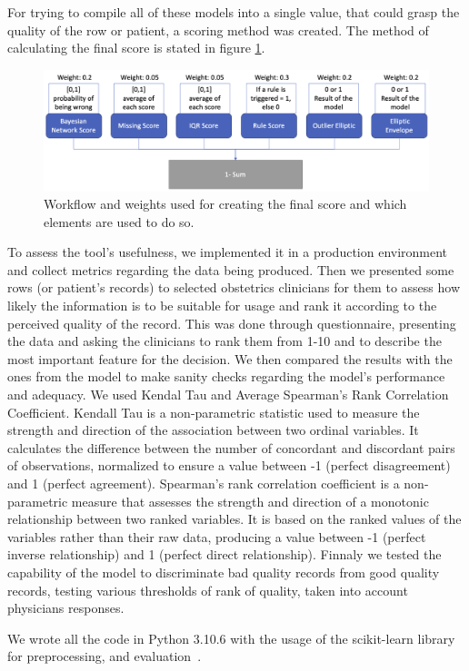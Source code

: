 For trying to compile all of these models into a single value, that could grasp the quality of the row or patient, a scoring method was created. The method of calculating the final score is stated in figure \ref{fig:scoring_method}. 
\begin{figure}[htbp]
    \centering
    \caption{Workflow and weights used for creating the final score and which elements are used to do so.}\label{fig:scoring_method} 
    \includegraphics[scale=0.29]{imgs/score-method.png}
    \end{figure}
To assess the tool's usefulness, we implemented it in a production environment and collect metrics regarding the data being produced. Then we presented some rows (or patient's records) to selected obstetrics clinicians for them to assess how likely the information is to be suitable for usage and rank it according to the perceived quality of the record. This was done through questionnaire, presenting the data and asking the clinicians to rank them from 1-10 and to describe the most important feature for the decision. We then compared the results with the ones from the model to make sanity checks regarding the model's performance and adequacy. We used Kendal Tau and Average Spearman's Rank Correlation Coefficient. Kendall Tau is a non-parametric statistic used to measure the strength and direction of the association between two ordinal variables. It calculates the difference between the number of concordant and discordant pairs of observations, normalized to ensure a value between -1 (perfect disagreement) and 1 (perfect agreement). Spearman's rank correlation coefficient is a non-parametric measure that assesses the strength and direction of a monotonic relationship between two ranked variables. It is based on the ranked values of the variables rather than their raw data, producing a value between -1 (perfect inverse relationship) and 1 (perfect direct relationship). Finnaly we tested the capability of the model to discriminate bad quality records from good quality records, testing various thresholds of rank of quality, taken into account physicians responses.

We wrote all the code in Python 3.10.6 with the usage of the scikit-learn library for preprocessing, and evaluation\unskip~\cite{scikit-learn}.

